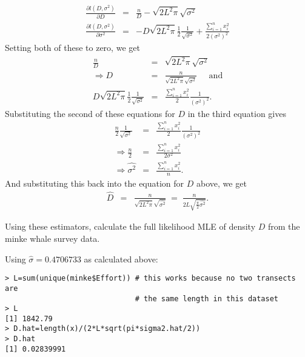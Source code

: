 \begin{questions}
\begin{parts}
\begin{subparts}
{\begin{solution}
\begin{eqnarray*}
\frac{\partial l(D,\sigma^2)}{\partial D}
&=&\frac{n}{D}-\sqrt{2L^2\pi}\sqrt{\sigma^2} \\
\frac{\partial l(D,\sigma^2)}{\partial \sigma^2}
&=&-D\sqrt{2L^2\pi}\frac{1}{2}\frac{1}{\sqrt{\sigma^2}}+\frac{\sum_{i=1}^n x_i^2}{2(\sigma^2)^2} \end{eqnarray*}
\noindent
Setting both of these to zero, we get
\begin{eqnarray*}
\frac{n}{D}&=&\sqrt{2L^2\pi}\sqrt{\sigma^2} \\
\Rightarrow D&=&\frac{n}{\sqrt{2L^2\pi}\sqrt{\sigma^2}} \;\;\;\;\;\mbox{and} \\
D\sqrt{2L^2\pi}\frac{1}{2}\frac{1}{\sqrt{\sigma^2}}&=&\frac{\sum_{i=1}^n x_i^2}{2}\frac{1}{(\sigma^2)^2}.
\end{eqnarray*}
\noindent
Substituting the second of these equations for $D$ in the third equation gives
\begin{eqnarray*}
\frac{n}{2}\frac{1}{\sqrt{\sigma^2}}
&=&
\frac{\sum_{i=1}^n x_i^2}{2}\frac{1}{(\sigma^2)^2} \\
\Rightarrow\frac{n}{2}&=&\frac{\sum_{i=1}^n x_i^2}{2\sigma^2} \\
\Rightarrow\widehat{\sigma^2}&=&\frac{\sum_{i=1}^n x_i^2}{n}.
\end{eqnarray*}
\noindent
And substituting this back into the equation for $D$ above, we get
\begin{eqnarray*}
\hat{D}&=&\frac{n}{\sqrt{2L^2\pi}\sqrt{\widehat{\sigma^2}}}
\;=\;\frac{n}{2L\sqrt{\frac{\pi}{2}\widehat{\sigma^2}}}.
\end{eqnarray*}
\end{solution}}

\item Using these estimators, calculate the full likelihood MLE of density $D$ from the minke whale survey data.

{\begin{solution}
Using $\hat{\sigma}=0.4706733$ as calculated above:
\begin{verbatim}
> L=sum(unique(minke$Effort)) # this works because no two transects are 
                              # the same length in this dataset
> L
[1] 1842.79
> D.hat=length(x)/(2*L*sqrt(pi*sigma2.hat/2))
> D.hat
[1] 0.02839991
\end{verbatim}
\end{solution}}

\end{subparts}

\end{parts}

\end{questions}

